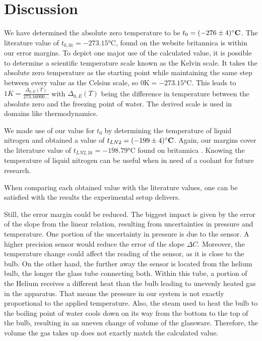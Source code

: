 \section{Discussion}
    We have determined the absolute zero temperature to be $t_0 = (-276 \pm 4)\si{\bf\celsius}$.
    The literature value of $t_{0, \text{lit}} = -273.15 \si{\celsius}$, found on the website britannica \cite{literature_absolute_zero} is within our error margins.
    To depict one major use of the calculated value, it is possible to determine a scientific temperature scale known as the Kelvin scale.
    It takes the absolute zero temperature as the starting point while maintaining the same step between every value as the Celsius scale, so $0 \si{\kelvin} = -273.15 \si{\celsius}$.
    This leads to $1K = \frac{\Delta_{0, E}(T)}{273.16000...}$ with $\Delta_{0, E}(T)$ being the difference in temperature between the absolute zero and the freezing point of water.
    The derived scale is used in domains like thermodynamics.

    We made use of our value for $t_0$ by determining the temperature of liquid nitrogen and obtained a value of $t_{LN2} = (-199 \pm 4)\si{\bf\celsius}$.
    Again, our margins cover the literature value of $t_{LN2, \text{lit}} = -198.79 \si{\celsius}$ found on britannica \cite{literature_liquid_nitrogen}.
    Knowing the temperature of liquid nitrogen can be useful when in need of a coolant for future research.

    When comparing each obtained value with the literature values, one can be satisfied with the results the experimental setup delivers.

    Still, the error margin could be reduced.
    The biggest impact is given by the error of the slope from the linear relation, resulting from uncertainties in pressure and temperature.
    One portion of the uncertainty in pressure is due to the sensor.
    A higher precision sensor would reduce the error of the slope $\Delta C$.
    Moreover, the temperature change could affect the reading of the sensor, as it is close to the bulb.
    On the other hand, the further away the sensor is located from the helium bulb, the longer the glass tube connecting both.
    Within this tube, a portion of the Helium receives a different heat than the bulb leading to unevenly heated gas in the apparatus.
    That means the pressure in our system is not exactly proportional to the applied temperature.
    Also, the steam used to heat the bulb to the boiling point of water cools down on its way from the bottom to the top of the bulb, resulting in an uneven change of volume of the glassware.
    Therefore, the volume the gas takes up does not exactly match the calculated value.

